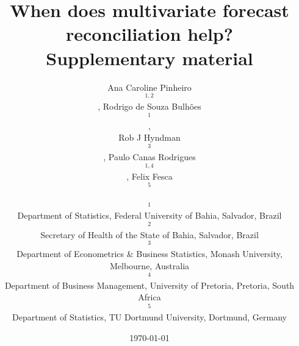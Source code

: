 \title{When does multivariate forecast reconciliation help?\\[0.3cm] \large Supplementary material}
\author{Ana Caroline Pinheiro$$^{1,2}$$, Rodrigo de Souza Bulh{\~o}es$$^{1}$$,\\ Rob J Hyndman$$^{3}$$, Paulo Canas Rodrigues$$^{1,4}$$, Felix Fesca$$^{5}$$\\[0.3cm]
  \small $$^1$$Department of Statistics, Federal University of Bahia, Salvador, Brazil\\
  \small $$^2$$Secretary of Health of the State of Bahia, Salvador, Brazil\\
  \small $$^3$$Department of Econometrics \& Business Statistics, Monash University, Melbourne, Australia\\
  \small $$^4$$Department of Business Management, University of Pretoria, Pretoria, South Africa\\
  \small $$^5$$Department of Statistics, TU Dortmund University, Dortmund, Germany}
\date{\today}
